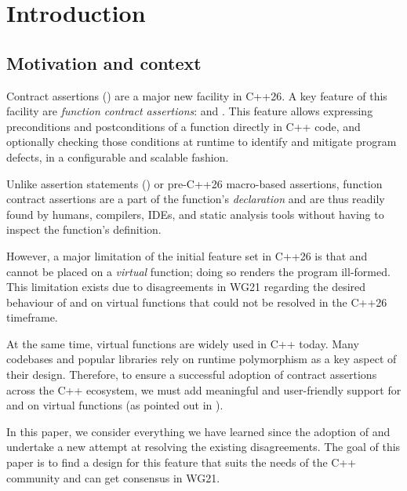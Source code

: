 

\section{Introduction}

\subsection{Motivation and context}

Contract assertions (\cite{P2900R14}) are a major new facility in C++26. A key feature of this facility are \emph{function contract assertions}:  and . This feature allows expressing
preconditions and postconditions of a function directly in C++ code, and optionally checking those conditions at runtime to identify and mitigate program defects, in a configurable and scalable fashion. 

Unlike assertion statements () or pre-C++26 macro-based assertions, function contract assertions are a part of the function's \emph{declaration} and are thus readily found by humans, compilers, IDEs, and static analysis tools without having to inspect the function's definition. 

However, a major limitation of the initial feature set in C++26 is that  and  cannot be placed on a \emph{virtual} function; doing so renders the program ill-formed. This limitation exists due to disagreements in WG21 regarding the desired behaviour of  and  on virtual functions that could not be resolved in the C++26 timeframe.

At the same time, virtual functions are widely used in C++ today. Many codebases and popular libraries rely on runtime polymorphism as a key aspect of their design. Therefore, to ensure a successful adoption of contract assertions across the C++ ecosystem, we must add meaningful and user-friendly support for  and  on virtual functions (as pointed out in \cite{P3173R0}).

In this paper, we consider everything we have learned since the adoption of \cite{P2900R14} and undertake a new attempt at resolving the existing disagreements. The goal of this paper is to find a design for this feature that suits the needs of the C++ community and can get consensus in WG21.

